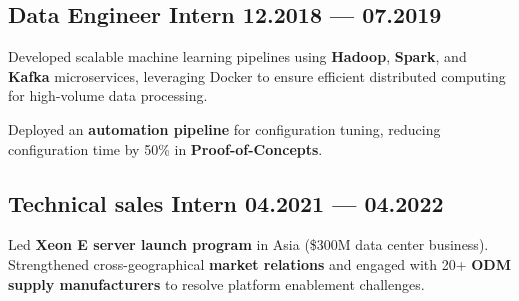 \subsection{{Data Engineer Intern \hfill 12.2018 --- 07.2019}}
\begin{zitemize}
        \item Developed scalable machine learning pipelines using \textbf{Hadoop}, \textbf{Spark}, and \textbf{Kafka} microservices, leveraging Docker to ensure efficient distributed computing for high-volume data processing.
        \item Deployed an \textbf{automation pipeline} for configuration tuning, reducing configuration time by 50\% in \textbf{Proof-of-Concepts}.
\end{zitemize}
\subsection{{Technical sales Intern \hfill 04.2021 --- 04.2022}}
\begin{zitemize}
\item Led \textbf{Xeon E server launch program} in Asia (\$300M data center business). Strengthened cross-geographical \textbf{market relations} and engaged with 20+ \textbf{ODM supply manufacturers} to resolve platform enablement challenges.
\end{zitemize}





